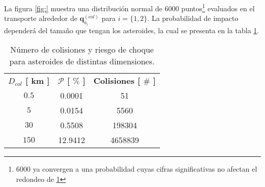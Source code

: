 La figura \ref{fig:} muestra una distribución normal de $6000$ puntos\footnote{$6000$ ya convergen a una probabilidad cuyas cifras significativas no afectan el redondeo de \ref{table:collision_table}} evaluados en el transporte alrededor de $\mathbf{q}_{a_i}^{(col)}$ para $i = \{1,2\}$. La probabilidad de impacto dependerá del tamaño que tengan los asteroides, la cual se presenta en la tabla \ref{table:collision_table}. 

\begin{table}[h!]
\centering
\begin{tabular}{c|c|c}
\toprule
\textbf{$ D_{col}$ [ km ]} & \textbf{$\mathcal{P}$ [ $\%$ ]} & \textbf{Colisiones [ $ \# $ ]} \\ \cmidrule(l){1-3} 
\textbf{$0.5$} &   0.0001                 & 51            \\
\textbf{$5$}   &   0.0154                 & 5560          \\
\textbf{$30$}  &   0.5508                 & 198304        \\
\textbf{$150$} &   12.9412                & 4658839       \\ \bottomrule 
\end{tabular}
\caption{Número de colisiones y riesgo de choque para asteroides de distintas dimensiones.}
\label{table:collision_table}
\end{table}






